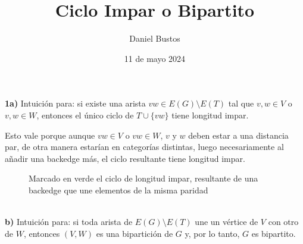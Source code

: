 \documentclass{article}
\title{Ciclo Impar o Bipartito}
\author{Daniel Bustos}
\date{11 de mayo 2024}
\begin{document}
\maketitle

\textbf{1a)} Intuición para: si existe una arista $vw \in E(G) \setminus E(T)$ tal que $v, w \in V$ o $v, w \in W$, entonces el único ciclo de $T \cup \{vw\}$ tiene longitud impar.

Esto vale porque aunque $vw \in V$ o $vw \in W$, $v$ y $w$ deben estar a una distancia par, de otra manera estarían en categorías distintas, luego necesariamente al añadir una backedge más, el ciclo resultante tiene longitud impar.
\begin{figure}[h]
\centering
{}
\caption{Marcado en verde el ciclo de longitud impar, resultante de una backedge que une elementos de la misma paridad}
\end{figure} \\
\textbf{b)} Intuición para: si toda arista de $E(G) \setminus E(T)$ une un vértice de $V$ con otro de $W$, entonces $(V, W)$ es una bipartición de $G$ y, por lo tanto, $G$ es bipartito.
\end{document}
